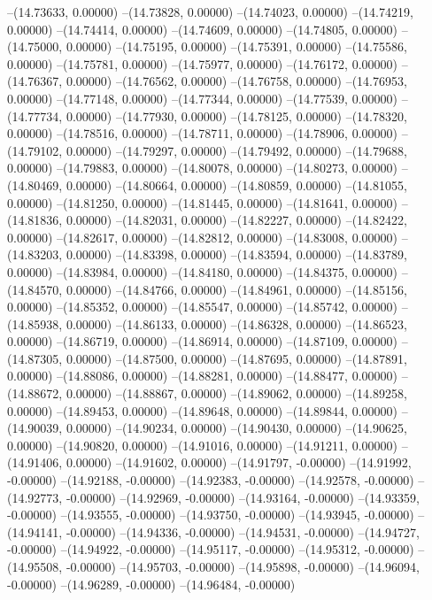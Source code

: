 --(14.73633, 0.00000)
--(14.73828, 0.00000)
--(14.74023, 0.00000)
--(14.74219, 0.00000)
--(14.74414, 0.00000)
--(14.74609, 0.00000)
--(14.74805, 0.00000)
--(14.75000, 0.00000)
--(14.75195, 0.00000)
--(14.75391, 0.00000)
--(14.75586, 0.00000)
--(14.75781, 0.00000)
--(14.75977, 0.00000)
--(14.76172, 0.00000)
--(14.76367, 0.00000)
--(14.76562, 0.00000)
--(14.76758, 0.00000)
--(14.76953, 0.00000)
--(14.77148, 0.00000)
--(14.77344, 0.00000)
--(14.77539, 0.00000)
--(14.77734, 0.00000)
--(14.77930, 0.00000)
--(14.78125, 0.00000)
--(14.78320, 0.00000)
--(14.78516, 0.00000)
--(14.78711, 0.00000)
--(14.78906, 0.00000)
--(14.79102, 0.00000)
--(14.79297, 0.00000)
--(14.79492, 0.00000)
--(14.79688, 0.00000)
--(14.79883, 0.00000)
--(14.80078, 0.00000)
--(14.80273, 0.00000)
--(14.80469, 0.00000)
--(14.80664, 0.00000)
--(14.80859, 0.00000)
--(14.81055, 0.00000)
--(14.81250, 0.00000)
--(14.81445, 0.00000)
--(14.81641, 0.00000)
--(14.81836, 0.00000)
--(14.82031, 0.00000)
--(14.82227, 0.00000)
--(14.82422, 0.00000)
--(14.82617, 0.00000)
--(14.82812, 0.00000)
--(14.83008, 0.00000)
--(14.83203, 0.00000)
--(14.83398, 0.00000)
--(14.83594, 0.00000)
--(14.83789, 0.00000)
--(14.83984, 0.00000)
--(14.84180, 0.00000)
--(14.84375, 0.00000)
--(14.84570, 0.00000)
--(14.84766, 0.00000)
--(14.84961, 0.00000)
--(14.85156, 0.00000)
--(14.85352, 0.00000)
--(14.85547, 0.00000)
--(14.85742, 0.00000)
--(14.85938, 0.00000)
--(14.86133, 0.00000)
--(14.86328, 0.00000)
--(14.86523, 0.00000)
--(14.86719, 0.00000)
--(14.86914, 0.00000)
--(14.87109, 0.00000)
--(14.87305, 0.00000)
--(14.87500, 0.00000)
--(14.87695, 0.00000)
--(14.87891, 0.00000)
--(14.88086, 0.00000)
--(14.88281, 0.00000)
--(14.88477, 0.00000)
--(14.88672, 0.00000)
--(14.88867, 0.00000)
--(14.89062, 0.00000)
--(14.89258, 0.00000)
--(14.89453, 0.00000)
--(14.89648, 0.00000)
--(14.89844, 0.00000)
--(14.90039, 0.00000)
--(14.90234, 0.00000)
--(14.90430, 0.00000)
--(14.90625, 0.00000)
--(14.90820, 0.00000)
--(14.91016, 0.00000)
--(14.91211, 0.00000)
--(14.91406, 0.00000)
--(14.91602, 0.00000)
--(14.91797, -0.00000)
--(14.91992, -0.00000)
--(14.92188, -0.00000)
--(14.92383, -0.00000)
--(14.92578, -0.00000)
--(14.92773, -0.00000)
--(14.92969, -0.00000)
--(14.93164, -0.00000)
--(14.93359, -0.00000)
--(14.93555, -0.00000)
--(14.93750, -0.00000)
--(14.93945, -0.00000)
--(14.94141, -0.00000)
--(14.94336, -0.00000)
--(14.94531, -0.00000)
--(14.94727, -0.00000)
--(14.94922, -0.00000)
--(14.95117, -0.00000)
--(14.95312, -0.00000)
--(14.95508, -0.00000)
--(14.95703, -0.00000)
--(14.95898, -0.00000)
--(14.96094, -0.00000)
--(14.96289, -0.00000)
--(14.96484, -0.00000)
